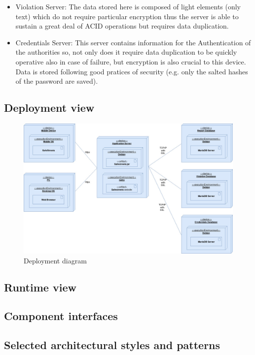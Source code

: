 \begin{itemize}
\begin{itemize}
            \item Violation Server: The data stored here is composed of light elements (only text) which do not require particular encryption thus the server 
                is able to sustain a great deal of ACID operations but requires data duplication.

            \item Credentials Server: This server contains information for the Authentication of the authorities so, not only does it require data duplication
                to be quickly operative also in case of failure, but encryption is also crucial to this device. Data is stored following good pratices of 
                security (e.g. only the salted hashes of the password are saved).     

        \end{itemize}
        
    \end{itemize}

\newpage



\subsection{Deployment view}

    \begin{figure}[H]

        \includegraphics[width=\textwidth]{Images/deployment.jpg}
        \caption{\label{fig:deployment}Deployment diagram}
        
    \end{figure}


\newpage

\subsection{Runtime view}

\subsection{Component interfaces}

\subsection{Selected architectural styles and patterns}